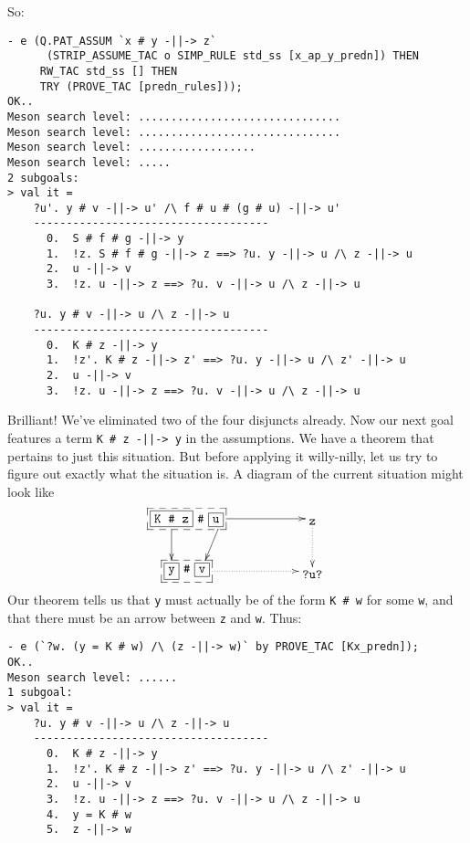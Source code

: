 So:
\begin{session}
\begin{verbatim}
- e (Q.PAT_ASSUM `x # y -||-> z`
      (STRIP_ASSUME_TAC o SIMP_RULE std_ss [x_ap_y_predn]) THEN
     RW_TAC std_ss [] THEN
     TRY (PROVE_TAC [predn_rules]));
OK..
Meson search level: ...............................
Meson search level: ...............................
Meson search level: ..................
Meson search level: .....
2 subgoals:
> val it =
    ?u'. y # v -||-> u' /\ f # u # (g # u) -||-> u'
    ------------------------------------
      0.  S # f # g -||-> y
      1.  !z. S # f # g -||-> z ==> ?u. y -||-> u /\ z -||-> u
      2.  u -||-> v
      3.  !z. u -||-> z ==> ?u. v -||-> u /\ z -||-> u

    ?u. y # v -||-> u /\ z -||-> u
    ------------------------------------
      0.  K # z -||-> y
      1.  !z'. K # z -||-> z' ==> ?u. y -||-> u /\ z' -||-> u
      2.  u -||-> v
      3.  !z. u -||-> z ==> ?u. v -||-> u /\ z -||-> u
\end{verbatim}
\end{session}
Brilliant!  We've eliminated two of the four disjuncts already.  Now
our next goal features a term \verb!K # z -||-> y! in the assumptions.
We have a theorem that pertains to just this situation.  But before
applying it willy-nilly, let us try to figure out exactly what the
situation is.  A diagram of the current situation might look like
\[\xymatrix @C=2cm {
*+<4pt>[F--]\txt{\fbox{\texttt{K\kern2mm \#\kern2mm z}} \texttt{\#} \fbox{\texttt{u}}} \ar[r] & \txt{\texttt{z}} \ar@{.>}[d] \\
*+<4pt>[F--]\txt{\fbox{\texttt{y}} \texttt{\#} \fbox{\texttt{v}}} \ar@{.>}[r] & \txt{\texttt{?u?}}
\ar "1,1"!<-12pt,0pt>;"2,1"!<-12pt,0pt>
\ar "1,1"!<28pt,0pt>;"2,1"!<11pt,0pt>
} \]
Our theorem tells us that \texttt{y} must actually be of the form
\verb!K # w! for some \texttt{w}, and that there must be an arrow
between \texttt{z} and \texttt{w}.  Thus:
\begin{session}
\begin{verbatim}
- e (`?w. (y = K # w) /\ (z -||-> w)` by PROVE_TAC [Kx_predn]);
OK..
Meson search level: ......
1 subgoal:
> val it =
    ?u. y # v -||-> u /\ z -||-> u
    ------------------------------------
      0.  K # z -||-> y
      1.  !z'. K # z -||-> z' ==> ?u. y -||-> u /\ z' -||-> u
      2.  u -||-> v
      3.  !z. u -||-> z ==> ?u. v -||-> u /\ z -||-> u
      4.  y = K # w
      5.  z -||-> w
\end{verbatim}
\end{session}
